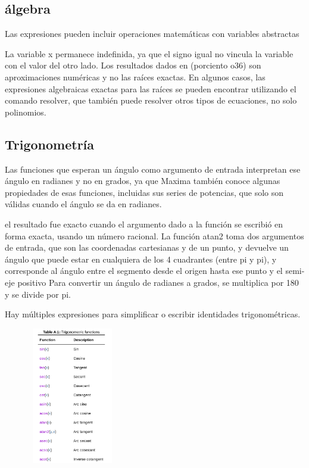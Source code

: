 \documentclass{article}
\begin{document}
\subsection{álgebra}

Las expresiones pueden incluir operaciones matemáticas con variables abstractas


La variable x permanece indefinida, ya que el signo igual no vincula la variable con el valor del otro lado. Los resultados dados en (porciento o36) son aproximaciones numéricas y no las raíces exactas. En algunos casos, las expresiones algebraicas exactas para las raíces se pueden encontrar utilizando el comando resolver, que también puede resolver otros tipos de ecuaciones, no solo polinomios.


\subsection{Trigonometría}

Las funciones que esperan un ángulo como argumento de entrada interpretan ese ángulo en radianes y no en grados, ya que Maxima también conoce algunas propiedades de esas funciones, incluidas sus series de potencias, que solo son válidas cuando el ángulo se da en radianes.

el resultado fue exacto cuando el argumento dado a la función se escribió en forma exacta, usando un número racional. La función atan2 toma dos argumentos de entrada, que son las coordenadas cartesianas y de un punto, y devuelve un ángulo que puede estar en cualquiera de los 4 cuadrantes (entre pi y pi), y corresponde al ángulo entre el segmento desde el origen hasta ese punto y el semi-eje positivo Para convertir un ángulo de radianes a grados, se multiplica por 180 y se divide por pi.

Hay múltiples expresiones para simplificar o escribir identidades trigonométricas.

\begin{center}
\includegraphics[width=6cm, height=6cm]{trig.png}

\end{center}
\end{document}
